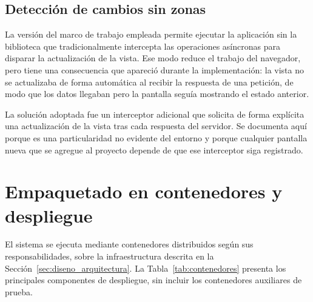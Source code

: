 \subsection{Detección de cambios sin zonas}
La versión del marco de trabajo empleada permite ejecutar la aplicación sin la biblioteca que
tradicionalmente intercepta las operaciones asíncronas para disparar la actualización de la
vista. Ese modo reduce el trabajo del navegador, pero tiene una consecuencia que apareció durante
la implementación: la vista no se actualizaba de forma automática al recibir la respuesta de una
petición, de modo que los datos llegaban pero la pantalla seguía mostrando el estado anterior.

La solución adoptada fue un interceptor adicional que solicita de forma explícita una
actualización de la vista tras cada respuesta del servidor. Se documenta aquí porque es una
particularidad no evidente del entorno y porque cualquier pantalla nueva que se agregue al
proyecto depende de que ese interceptor siga registrado.

\section{Empaquetado en contenedores y despliegue}
\label{sec:impl_despliegue}
El sistema se ejecuta mediante contenedores distribuidos según sus responsabilidades, sobre la infraestructura descrita en la
Sección~\ref{sec:diseno_arquitectura}. La Tabla~\ref{tab:contenedores} presenta los principales componentes de despliegue, sin incluir los contenedores auxiliares de prueba.


\small
\renewcommand{\arraystretch}{1.2}
\setlength{\tabcolsep}{4pt}

